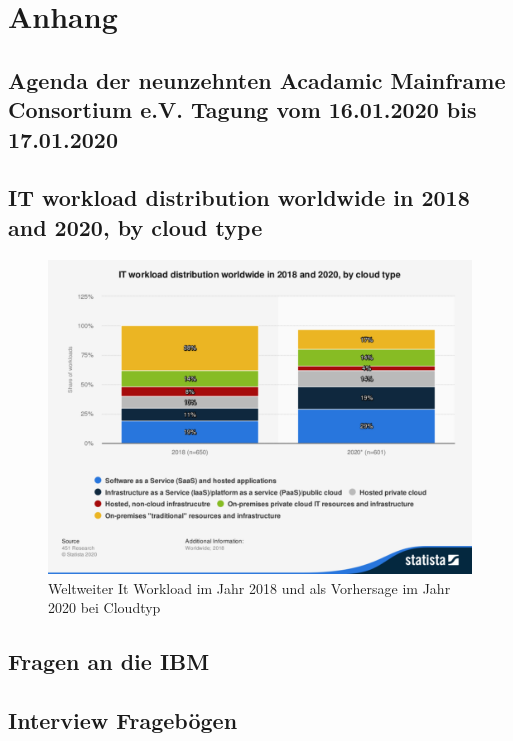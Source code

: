\chapter{Anhang}\label{app:Anhang}

\section{Agenda der neunzehnten Acadamic Mainframe Consortium e.V. Tagung vom 16.01.2020 bis 17.01.2020}\label{app:AMC}


\section{IT workload distribution worldwide in 2018 and 2020, by cloud type}
\begin{figure}[ht!]
\centering
\includegraphics[width=\textwidth]{figures/statistic_id748238_it-workload-distribution-globally-2018-and-2020-by-cloud-type.pdf}
\caption{Weltweiter It Workload im Jahr 2018 und als Vorhersage im Jahr 2020 bei Cloudtyp }
\label{app:itworkload}
\end{figure}

\section{Fragen an die IBM}\label{app:ibm}



\section{Interview Fragebögen}\label{app:fragen}











